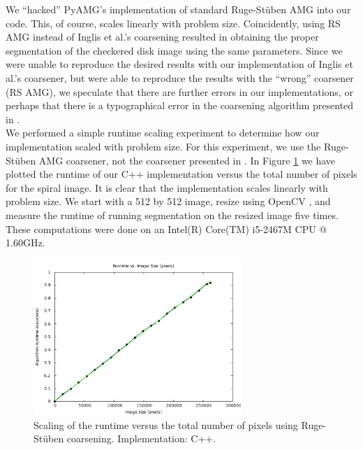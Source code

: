 \documentclass[12pt]{article}%
\begin{document}
We ``hacked'' PyAMG's implementation \cite{pyamg:2011} of standard Ruge-St\"uben AMG into our code.  This, of course, scales linearly with problem size.  Coincidently, using RS AMG instead of Inglis et al.'s coarsening resulted in obtaining the proper segmentation of the checkered disk image using the same parameters.  Since we were unable to reproduce the desired results with our implementation of Inglis et al.'s coarsener, but were able to reproduce the results with the ``wrong'' coarsener (RS AMG), we speculate that there are further errors in our implementations, or perhaps that there is a typographical error in the coarsening algorithm presented in \cite{inglis:2010}.\\  %

We performed a simple runtime scaling experiment to determine how our implementation scaled with problem size.  For this experiment, we use the Ruge-St\"uben AMG coarsener, not the coarsener presented in \cite{inglis:2010}.  In Figure \ref{fig:runtime_scaling} we have plotted the runtime of our C++ implementation versus the total number of pixels for the spiral image.  It is clear that the implementation scales linearly with problem size.  We start with a 512 by 512 image, resize using OpenCV \cite{opencv:2000}, and measure the runtime of running segmentation on the resized image five times.  These computations were done on an Intel(R) Core(TM) i5-2467M CPU @ 1.60GHz.\\


\begin{figure}[ht]
   \centering
   \includegraphics[width=0.7\textwidth]{runtime_scaling_RSAMG_spiral_512_james.pdf}
   \caption{Scaling of the runtime versus the total number of pixels using Ruge-St\"uben coarsening.  Implementation: C++.}
   \label{fig:runtime_scaling}
\end{figure}
\end{document}
